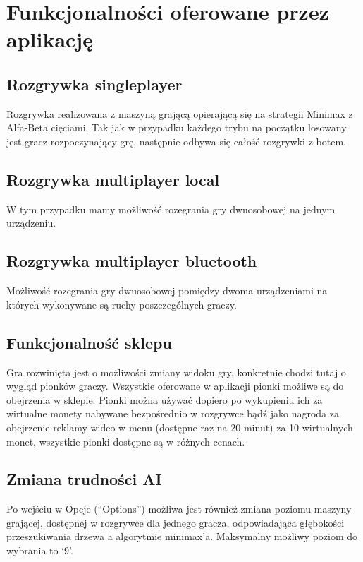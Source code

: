 \newpage\section{Funkcjonalności oferowane przez aplikację}

\subsection{Rozgrywka singleplayer}
Rozgrywka realizowana z maszyną grającą opierającą się na strategii Minimax z Alfa-Beta cięciami. Tak jak w przypadku każdego trybu na początku losowany jest gracz rozpoczynający grę, następnie odbywa się całość rozgrywki z botem.

\subsection{Rozgrywka multiplayer local}
W tym przypadku mamy możliwość rozegrania gry dwuosobowej na jednym urządzeniu.

\subsection{Rozgrywka multiplayer bluetooth}
Możliwość rozegrania gry dwuosobowej pomiędzy dwoma urządzeniami na których wykonywane są ruchy poszczególnych graczy.

\subsection{Funkcjonalność sklepu}
Gra rozwinięta jest o możliwości zmiany widoku gry, konkretnie chodzi tutaj o wygląd pionków graczy. Wszystkie oferowane w aplikacji pionki możliwe są do obejrzenia w sklepie. Pionki można używać dopiero po wykupieniu ich za wirtualne monety nabywane bezpośrednio w rozgrywce bądź jako nagroda za obejrzenie reklamy wideo w menu (dostępne raz na 20 minut) za 10 wirtualnych monet, wszystkie pionki dostępne są w różnych cenach.

\subsection{Zmiana trudności AI}
Po wejściu w Opcje (“Options”) możliwa jest również zmiana poziomu maszyny grającej, dostępnej w rozgrywce dla jednego gracza, odpowiadająca głębokości przeszukiwania drzewa a algorytmie minimax’a. Maksymalny możliwy poziom do wybrania to ‘9’.